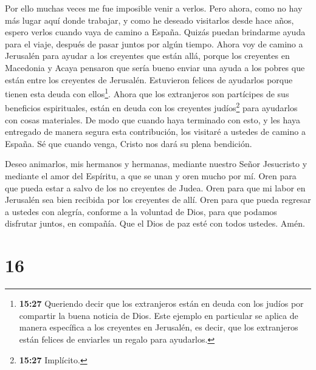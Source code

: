  Por ello muchas veces me fue imposible venir a verlos.
 Pero ahora, como no hay más lugar aquí donde trabajar, y
como he deseado visitarlos desde hace años,  espero verlos
cuando vaya de camino a España. Quizás puedan brindarme ayuda para el
viaje, después de pasar juntos por algún tiempo.  Ahora voy
de camino a Jerusalén para ayudar a los creyentes que están allá,
 porque los creyentes en Macedonia y Acaya pensaron que
sería bueno enviar una ayuda a los pobres que están entre los creyentes
de Jerusalén.  Estuvieron felices de ayudarlos porque
tienen esta deuda con ellos\footnote{\textbf{15:27} Queriendo decir que
  los extranjeros están en deuda con los judíos por compartir la buena
  noticia de Dios. Este ejemplo en particular se aplica de manera
  específica a los creyentes en Jerusalén, es decir, que los extranjeros
  están felices de enviarles un regalo para ayudarlos.}. Ahora que los
extranjeros son partícipes de sus beneficios espirituales, están en
deuda con los creyentes judíos\footnote{\textbf{15:27} Implícito.} para
ayudarlos con cosas materiales.  De modo que cuando haya
terminado con esto, y les haya entregado de manera segura esta
contribución, los visitaré a ustedes de camino a España. 
Sé que cuando venga, Cristo nos dará su plena bendición.

 Deseo animarlos, mis hermanos y hermanas, mediante nuestro
Señor Jesucristo y mediante el amor del Espíritu, a que se unan y oren
mucho por mí.  Oren para que pueda estar a salvo de los no
creyentes de Judea. Oren para que mi labor en Jerusalén sea bien
recibida por los creyentes de allí.  Oren para que pueda
regresar a ustedes con alegría, conforme a la voluntad de Dios, para que
podamos disfrutar juntos, en compañía.  Que el Dios de paz
esté con todos ustedes. Amén.

\hypertarget{section-15}{%
\section{16}\label{section-15}}

